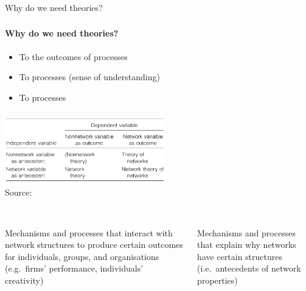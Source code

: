 \documentclass[8pt]{beamer}
\begin{document}





\begin{frame}
\frametitle{\insertsection}

\centering
\Large Why do we need theories?

\end{frame}


\begin{frame}
\frametitle{\insertsection}
\framesubtitle{Why do we need theories?}


\cite{Reynolds1971}
\begin{itemize}
\item To {\color{blue}{predict}} the outcomes of processes 
\item To {\color{blue}{explain}} processes (sense of understanding)
\item To {\color{blue}{control}} processes
\end{itemize}


\end{frame}



\begin{frame}
\frametitle{\insertsection}


\centering
\includegraphics[width=7cm]{borgatti}\\
{\tiny Source: \cite{Borgatti2011}}


\vspace{1cm}

\begin{columns}[t]
\footnotesize
{\color{blue}{Network theory}}\\
Mechanisms and processes that interact with network structures to produce certain outcomes for individuals, groups, and organisations (e.g.\ firms' performance, individuals' creativity)

\footnotesize
{\color{blue}{Theory of networks}}\\
Mechanisms and processes that explain why networks have certain structures (i.e.\ antecedents of network properties)
\end{columns}

\end{frame}
\end{document}
